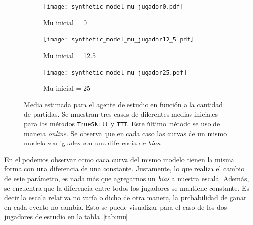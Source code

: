 \documentclass[11pt,twoside,spanish]{report} %
\begin{document}
\begin{figure}[H]
  \begin{subfigure}{0.33\textwidth}
    \texttt{[image: synthetic\_model\_mu\_jugador0.pdf]}
    \caption{Mu inicial = 0}
    \label{fig:Mu_jugador0}
  \end{subfigure}%
  \hfill
  \begin{subfigure}{0.33\textwidth}
    \texttt{[image: synthetic\_model\_mu\_jugador12\_5.pdf]}
    \caption{Mu inicial = 12.5}
    \label{fig:Mu_jugador12_5}
  \end{subfigure}%
  \hfill
  \begin{subfigure}{0.33\textwidth}
    \texttt{[image: synthetic\_model\_mu\_jugador25.pdf]}
    \caption{Mu inicial = 25}
    \label{fig:Mu_jugador25}
  \end{subfigure}

  \caption{Media estimada para el agente de estudio en funci\'on a la cantidad de partidas.	Se muestran tres casos de diferentes medias iniciales para los m\'etodos \texttt{TrueSkill} y \texttt{TTT}. Este \'ultimo m\'etodo se uso de manera \textit{online}. Se observa que en cada caso las curvas de un mismo modelo son iguales con una diferencia de \emph{bias}.}
  \label{fig:Mu_lc}
\end{figure}


En el podemos observar como cada curva del mismo modelo tienen la misma forma con una diferencia de una constante.
Justamente, lo que realiza el cambio de este par\'ametro, es nada m\'as que agregarnos un \textit{bias} a nuestra escala.
Adem\'as, se encuentra que la diferencia entre todos los jugadores se mantiene constante.
Es decir la escala relativa no var\'ia o dicho de otra manera,  la probabilidad de ganar en cada evento no cambia.
Esto se puede visualizar para el caso de los dos jugadores de estudio en la tabla~\ref{tab:mu}
\end{document}
